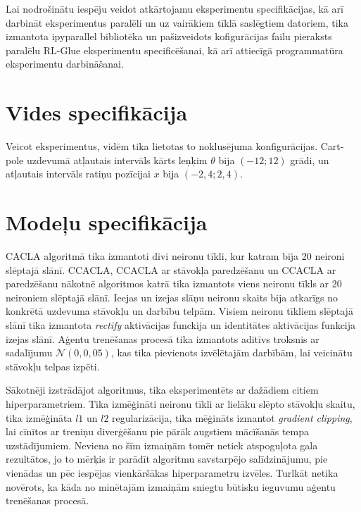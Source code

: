 \documentclass{ludis} %
\begin{document}
Lai nodrošinātu iespēju veidot atkārtojamu eksperimentu specifikācijas, kā arī
darbināt eksperimentus paralēli un uz vairākiem tīklā saslēgtiem datoriem, tika
izmantota ipyparallel bibliotēka \autocite{ipyparallel} un pašizveidots
kofigurācijas failu pieraksts paralēlu RL-Glue eksperimentu specificēšanai, kā
arī attiecīgā programmatūra eksperimentu darbināšanai.

\section{Vides specifikācija}
Veicot eksperimentus, vidēm tika lietotas to noklusējuma konfigurācijas.
Cart-pole uzdevumā atļautais intervāls kārts leņķim $\theta$ bija $(-12; 12)$
grādi, un atļautais intervāls ratiņu pozīcijai $x$ bija $(-2,4; 2,4)$.


\section{Modeļu specifikācija}
CACLA algoritmā tika izmantoti divi neironu tīkli, kur katram bija 20
neironi slēptajā slānī. CCACLA, CCACLA ar stāvokļa paredzēšanu un CCACLA ar
paredzēšanu nākotnē algoritmos katrā tika izmantots viens neironu tīkls ar 20
neironiem slēptajā slānī. Ieejas un izejas slāņu neironu skaits bija atkarīgs no
konkrētā uzdevuma stāvokļu un darbību telpām. Visiem neironu tīkliem slēptajā
slānī tika izmantota \textit{rectify} aktivācijas funckija un identitātes
aktivācijas funkcija izejas slānī. Aģentu trenēšanas procesā tika izmantots
aditīvs troksnis ar sadalījumu $\mathcal{N}(0, 0,05)$, kas tika pievienots
izvēlētajām darbībām, lai veicinātu stāvokļu telpas izpēti.

Sākotnēji izstrādājot algoritmus, tika eksperimentēts ar dažādiem citiem
hiperparametriem. Tika izmēģināti neironu tīkli ar lielāku slēpto stāvokļu
skaitu, tika izmēģināta $l1$ un $l2$ regularizācija, tika mēģināts izmantot
\textit{gradient clipping}, lai cīnītos ar treniņu diverģēšanu pie pārāk
augstiem mācīšanās tempa uzstādījumiem. Neviena no šīm izmaiņām tomēr netiek
atspoguļota gala rezultātos, jo to mērķis ir parādīt algoritmu savstarpējo
salīdzinājumu, pie vienādas un pēc iespējas vienkāršākas hiperparametru izvēles.
Turlkāt netika novērots, ka kāda no minētajām izmaiņām sniegtu būtisku ieguvumu
aģentu trenēšanas procesā.
\end{document}
